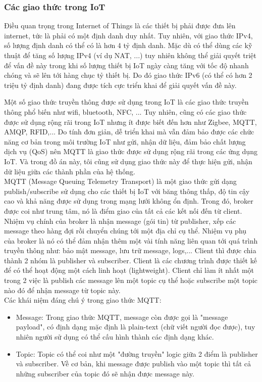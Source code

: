\subsubsection{Các giao thức trong IoT}
Điều quan trọng trong Internet of Things là các thiết bị phải được đưa lên internet, tức là phải có một định danh duy nhất. Tuy nhiên, với giao thức IPv4, số lượng định danh có thể có là hơn 4 tỷ định danh. Mặc dù có thể dùng các kỹ thuật để tăng số lượng IPv4 (ví dụ NAT, ...) tuy nhiên không thể giải quyết triệt để vấn đề này trong khi số lượng thiết bị IoT ngày càng tăng với tốc độ nhanh chóng và sẽ lên tới hàng chục tỷ thiết bị. Do đó giao thức IPv6 (có thể có hơn 2 triệu tỷ định danh) đang được tích cực triển khai để giải quyết vấn đề này. 

Một số giao thức truyền thông được sử dụng trong IoT là các giao thức truyền thông phổ biến như wifi, bluetooth, NFC, ... Tuy nhiên, cũng có các giao thức được sử dụng rộng rãi trong IoT nhưng ít được biết đến hơn như Zigbee, MQTT, AMQP, RFID,... Do tính đơn giản, dễ triển khai mà vẫn đảm bảo được các chức năng cơ bản trong môi trường IoT như gửi, nhận dữ liệu, đảm bảo chất lượng dịch vụ (QoS) nên MQTT là giao thức được sử dụng rộng rãi trong các ứng dụng IoT. Và trong đồ án này, tôi cũng sử dụng giao thức này để thực hiện gửi, nhận dữ liệu giữa các thành phần của hệ thống.\\ 
MQTT (Message Queuing Telemetry Transport) là một giao thức gửi dạng publish/subscribe sử dụng cho các thiết bị IoT với băng thông thấp, độ tin cậy cao và khả năng được sử dụng trong mạng lưới không ổn định. Trong đó, broker được coi như trung tâm, nó là điểm giao của tất cả các kết nối đến từ client. Nhiệm vụ chính của broker là nhận message (gói tin) từ publisher, xếp các message theo hàng đợi rồi chuyển chúng tới một địa chỉ cụ thể. Nhiệm vụ phụ của broker là nó có thể đảm nhận thêm một vài tính năng liên quan tới quá trình truyền thông như: bảo mật message, lưu trữ message, logs,...
Client thì được chia thành 2 nhóm là publisher và subscriber. Client là các chương trình được thiết kế để có thể hoạt động một cách linh hoạt (lightweight). Client chỉ làm ít nhất một trong 2 việc là publish các message lên một topic cụ thể hoặc subscribe một topic nào đó để nhận message từ topic này. \\

Các khái niệm đáng chú ý trong giao thức MQTT:\\
\begin{itemize}
	\item Message: Trong giao thức MQTT, message còn được gọi là "message payload", có định dạng mặc định là plain-text (chữ viết người đọc được), tuy nhiên người sử dụng có thể cấu hình thành các định dạng khác.
	\item Topic: Topic có thể coi như một "đường truyền" logic giữa 2 điểm là publisher và subscriber. Về cơ bản, khi message được publish vào một topic thì tất cả những subscriber của topic đó sẽ nhận được message này. 
\end{itemize}

